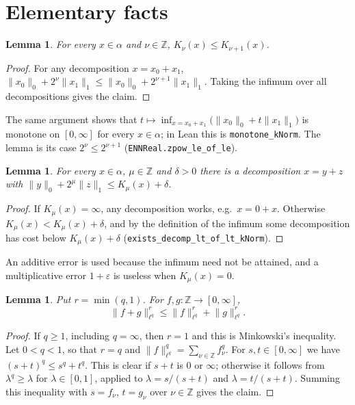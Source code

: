 \documentclass[11pt]{article}
\newtheorem{lemma}[theorem]{Lemma}
\theoremstyle{definition}
\theoremstyle{remark}
\newcommand{\norm}[2]{\lVert #1\rVert_{#2}}
\newcommand{\Z}{\mathbb Z}
\begin{document}
\section{Elementary facts}

\begin{lemma}\label{lem:K-dyadic}
  For every \(x \in \alpha\) and \(\nu \in \Z\),
  \(K_\nu(x) \le K_{\nu+1}(x)\).
\end{lemma}

\begin{proof}
  For any decomposition \(x = x_0 + x_1\),
  \(\norm{x_0}{0} + 2^\nu\norm{x_1}{1} \le \norm{x_0}{0} + 2^{\nu+1}\norm{x_1}{1}\).
  Taking the infimum over all decompositions gives the claim.
\end{proof}

The same argument shows that \(t \mapsto \inf_{x = x_0 + x_1}\bigl(\norm{x_0}{0} +
t\norm{x_1}{1}\bigr)\) is monotone on \([0,\infty]\) for every \(x \in \alpha\); in Lean this is
\texttt{monotone\_kNorm}. The lemma is its case \(2^\nu \le 2^{\nu+1}\)
(\texttt{ENNReal.zpow\_le\_of\_le}).

\begin{lemma}\label{lem:near-opt}
  For every \(x \in \alpha\), \(\mu \in \Z\) and \(\delta > 0\) there is a decomposition
  \(x = y + z\) with \(\norm{y}{0} + 2^\mu \norm{z}{1} \le K_\mu(x) + \delta\).
\end{lemma}

\begin{proof}
  If \(K_\mu(x) = \infty\), any decomposition works, e.g.\ \(x = 0 + x\). Otherwise
  \(K_\mu(x) < K_\mu(x) + \delta\), and by the definition of the infimum some decomposition
  has cost below \(K_\mu(x) + \delta\) (\texttt{exists\_decomp\_lt\_of\_lt\_kNorm}).
\end{proof}

An additive error is used because the infimum need not be attained, and a multiplicative error
\(1 + \varepsilon\) is useless when \(K_\mu(x) = 0\).

\begin{lemma}\label{lem:lq-sub}
  Put \(r = \min(q,1)\). For \(f, g \colon \Z \to [0,\infty]\),
  \[
    \norm{f+g}{\ell^q}^r \le \norm{f}{\ell^q}^r + \norm{g}{\ell^q}^r .
  \]
\end{lemma}

\begin{proof}
  If \(q \ge 1\), including \(q = \infty\), then \(r = 1\) and this is Minkowski's inequality.
  Let \(0 < q < 1\), so that \(r = q\) and \(\norm{f}{\ell^q}^q = \sum_{\nu \in \Z} f_\nu^q\).
  For \(s, t \in [0,\infty]\) we have \((s+t)^q \le s^q + t^q\). This is clear if \(s+t\) is
  \(0\) or \(\infty\); otherwise it follows from \(\lambda^q \ge \lambda\) for
  \(\lambda \in [0,1]\), applied to \(\lambda = s/(s+t)\) and \(\lambda = t/(s+t)\). Summing
  this inequality with \(s = f_\nu\), \(t = g_\nu\) over \(\nu \in \Z\) gives the claim.
\end{proof}
\end{document}
